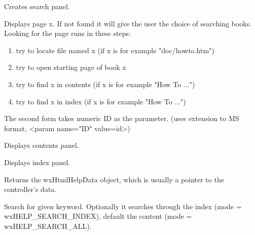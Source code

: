 
Creates search panel.

\label{wxhtmlhelpwindowdisplay}



Displays page x. If not found it will give the user the choice of
searching books.
Looking for the page runs in these steps:

\begin{enumerate}\itemsep=0pt
\item try to locate file named x (if x is for example "doc/howto.htm")
\item try to open starting page of book x
\item try to find x in contents (if x is for example "How To ...")
\item try to find x in index (if x is for example "How To ...")
\end{enumerate}

The second form takes numeric ID as the parameter.
(uses extension to MS format, <param name="ID" value=id>)


\label{wxhtmlhelpwindowdisplaycontents}


Displays contents panel.

\label{wxhtmlhelpwindowdisplayindex}


Displays index panel.

\label{wxhtmlhelpwindowgetdata}


Returns the wxHtmlHelpData object, which is usually a pointer to the controller's data.

\label{wxhtmlhelpwindowkeywordsearch}


Search for given keyword. Optionally it searches through the index (mode =
wxHELP\_SEARCH\_INDEX), default the content (mode = wxHELP\_SEARCH\_ALL).

